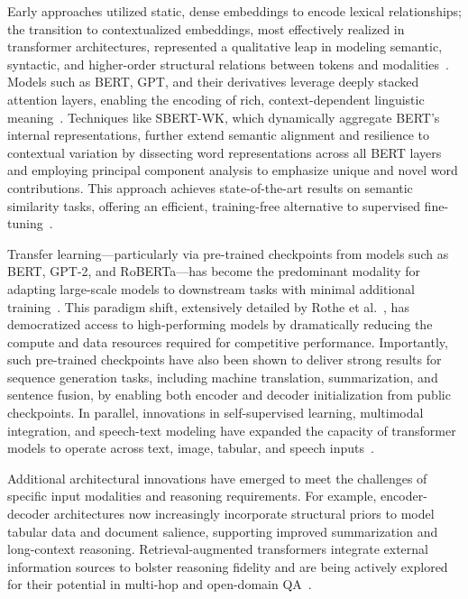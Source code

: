 \documentclass[sigconf]{acmart}
\begin{document}
Early approaches utilized static, dense embeddings to encode lexical relationships; the transition to contextualized embeddings, most effectively realized in transformer architectures, represented a qualitative leap in modeling semantic, syntactic, and higher-order structural relations between tokens and modalities~\cite{ref72,ref74,ref75,ref77}. Models such as BERT, GPT, and their derivatives leverage deeply stacked attention layers, enabling the encoding of rich, context-dependent linguistic meaning~\cite{ref100}. Techniques like SBERT-WK, which dynamically aggregate BERT’s internal representations, further extend semantic alignment and resilience to contextual variation by dissecting word representations across all BERT layers and employing principal component analysis to emphasize unique and novel word contributions. This approach achieves state-of-the-art results on semantic similarity tasks, offering an efficient, training-free alternative to supervised fine-tuning~\cite{ref77}.

Transfer learning---particularly via pre-trained checkpoints from models such as BERT, GPT-2, and RoBERTa---has become the predominant modality for adapting large-scale models to downstream tasks with minimal additional training~\cite{ref100}. This paradigm shift, extensively detailed by Rothe et al.~\cite{ref100}, has democratized access to high-performing models by dramatically reducing the compute and data resources required for competitive performance. Importantly, such pre-trained checkpoints have also been shown to deliver strong results for sequence generation tasks, including machine translation, summarization, and sentence fusion, by enabling both encoder and decoder initialization from public checkpoints. In parallel, innovations in self-supervised learning, multimodal integration, and speech-text modeling have expanded the capacity of transformer models to operate across text, image, tabular, and speech inputs~\cite{ref72,ref77}.

Additional architectural innovations have emerged to meet the challenges of specific input modalities and reasoning requirements. For example, encoder-decoder architectures now increasingly incorporate structural priors to model tabular data and document salience, supporting improved summarization and long-context reasoning. Retrieval-augmented transformers integrate external information sources to bolster reasoning fidelity and are being actively explored for their potential in multi-hop and open-domain QA~\cite{ref75,ref77,ref100}.
\end{document}
